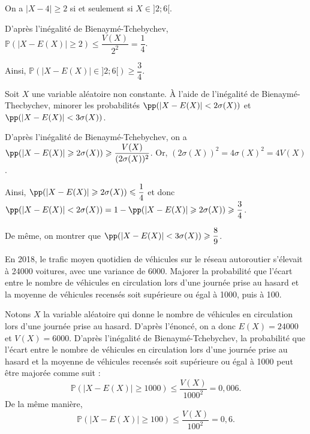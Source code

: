 \documentclass[11pt,fleqn, openany]{book} %
\begin{document}
\begin{solution}On a $|X-4|\geqslant 2$ si et seulement si $X \in ]2;6[$.

D'après l'inégalité de Bienaymé-Tchebychev, $\mathbb{P}(|X-E(X)|\geqslant 2)\leqslant \dfrac{V(X)}{2^2} =\dfrac{1}{4}$.

Ainsi, $\mathbb{P}(|X-E(X)| \in ]2;6[) \geqslant \dfrac{3}{4}$.\end{solution}

\begin{exercise}[topic=lgn03]Soit $X$ une variable aléatoire non constante. À l'aide de l'inégalité de Bienaymé-Thecbychev, minorer les probabilités $\pp(|X-E(X)|<2 \sigma(X))$ et $\pp(|X-E(X)|< 3 \sigma(X))$.\end{exercise}

\begin{solution}
D'après l'inégalité de Bienaymé-Tchebychev, on a $\pp(|X-E(X)|\geqslant 2\sigma (X)) \geqslant \dfrac{V(X)}{(2\sigma(X))^2}$. Or, $(2\sigma(X))^2=4\sigma(X)^2=4V(X)$.

Ainsi, $\pp(|X-E(X)|\geqslant 2\sigma (X)) \leqslant \dfrac{1}{4}$ et donc $\pp(|X-E(X)|< 2\sigma (X)) = 1- \pp(|X-E(X)|\geqslant 2\sigma (X)) \geqslant \dfrac{3}{4}$.

De même, on montrer que $\pp(|X-E(X)|< 3\sigma (X)) \geqslant \dfrac{8}{9}$.
\end{solution}


\begin{exercise}[topic=lgn03]En 2018, le trafic moyen quotidien de véhicules sur le réseau autoroutier s'élevait à 24000 voitures, avec une variance de 6000. Majorer la probabilité que l'écart entre le nombre de véhicules en circulation lors d'une journée prise au hasard et la moyenne de véhicules recensés soit supérieure ou égal à 1000, puis à 100.\end{exercise}

\begin{solution} Notons $X$ la variable aléatoire qui donne le nombre de véhicules en circulation lors d'une journée prise au hasard. D'après l'énoncé, on a donc $E(X)=24000$ et $V(X)=6000$. D'après l'inégalité de Bienaymé-Tchebychev, la probabilité que l'écart entre le nombre de véhicules en circulation lors d'une journée prise au hasard et la moyenne de véhicules recensés soit supérieure ou égal à 1000 peut être majorée comme suit :
\[ \mathbb{P}(|X-E(X)| \geqslant 1000) \leqslant \dfrac{V(X)}{1000^2} = 0,006.\]
De la même manière,
\[ \mathbb{P}(|X-E(X)| \geqslant 100) \leqslant \dfrac{V(X)}{100^2} = 0,6.\]\end{solution}
\end{document}
